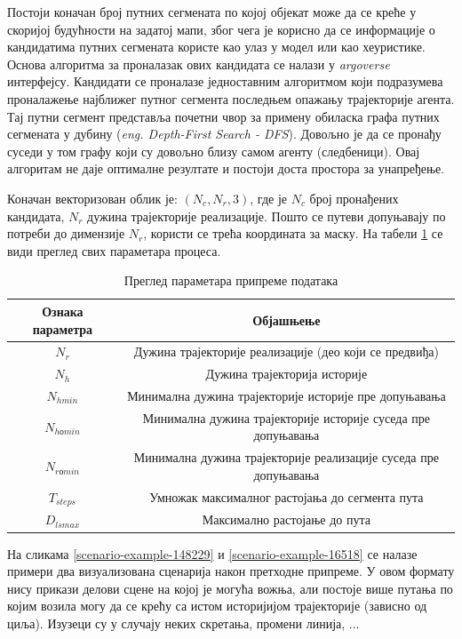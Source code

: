 \documentclass[11pt,oneside]{memoir}
\begin{document}
Постоји коначан број путних сегмената по којој
објекат може да се креће у скоријој будућности на задатој мапи, због чега је корисно да се информације о кандидатима путних сегмената
користе као улаз у модел или као хеуристике.
Основа алгоритма за проналазак ових кандидата се налази у \textit{argoverse} интерфејсу. Кандидати се проналазе једноставним
алгоритмом који подразумева проналажење најближег путног сегмента последњем опажању трајекторије агента. Тај путни
сегмент представља почетни чвор за примену обиласка графа путних сегмената у дубину (\textit{eng. Depth-First Search - DFS}). 
Довољно је да се пронађу суседи у том графу који су довољно близу самом агенту (следбеници). \cite{argoverse}
Овај алгоритам не даје оптималне резултате и постоји доста простора за унапређење. 


Коначан векторизован облик је: $(N_c, N_r, 3)$, где је $N_c$ број пронађених кандидата,
$N_r$ дужина трајекторије реализације. Пошто се путеви допуњавају по потреби до димензије $N_r$, користи се трећа координата
за маску. На табели \ref{dp-params-table} се види преглед свих параметара процеса.

\begin{table}
  \begin{tabular}{c|c}
    Ознака параметра & Објашњење \\
    \hline
    $N_r$ & Дужина трајекторије реализације (део који се предвиђа) \\
    $N_h$ & Дужина трајекторија историје \\
    $N_{hmin}$ & Минимална дужина трајекторије историје пре допуњавања \\
    $N_{hоmin}$ & Минимална дужина трајекторије историје суседа пре допуњавања \\
    $N_{rоmin}$ & Минимална дужина трајекторије реализације суседа пре допуњавања \\
    $T_{steps}$ & Умножак максималног растојања до сегмента пута \\
    $D_{lsmax}$ & Максимално растојање до пута
  \end{tabular}
  \caption{Преглед параметара припреме података}
  \label{dp-params-table}
\end{table}

На сликама \ref{scenario-example-148229} и \ref{scenario-example-16518} се налазе примери два визуализована сценарија
након претходне припреме. У овом формату нису прикази делови сцене на којој је могућа вожња, али 
постоје више путања по којим возила могу да се крећу са истом историјијом трајекторије (зависно од циља). 
Изузеци су у случају неких скретања, промени линија, ...
\end{document}
